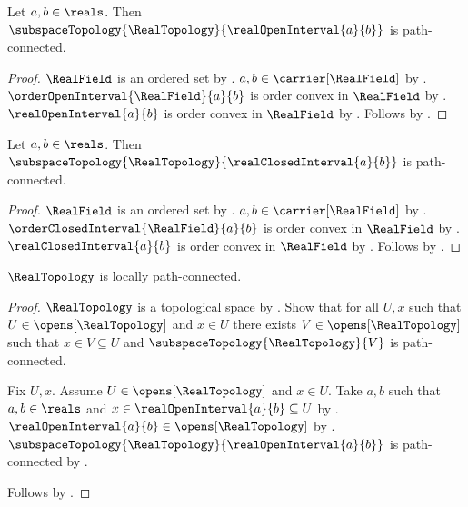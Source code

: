 \begin{theorem}\label{real_open_interval_is_path_connected}
    Let $a,b\in\reals$.
    Then $\subspaceTopology{\RealTopology}{\realOpenInterval{a}{b}}$ is path-connected.
\end{theorem}
\begin{proof}
    $\RealField$ is an ordered set by
        .
    $a,b\in\carrier[\RealField]$ by .
    $\orderOpenInterval{\RealField}{a}{b}$ is order convex in $\RealField$ by
        .
    $\realOpenInterval{a}{b}$ is order convex in $\RealField$ by
        .
    Follows by .
\end{proof}

\begin{theorem}\label{real_closed_interval_is_path_connected}
    Let $a,b\in\reals$.
    Then $\subspaceTopology{\RealTopology}{\realClosedInterval{a}{b}}$ is path-connected.
\end{theorem}
\begin{proof}
    $\RealField$ is an ordered set by
        .
    $a,b\in\carrier[\RealField]$ by .
    $\orderClosedInterval{\RealField}{a}{b}$ is order convex in $\RealField$ by
        .
    $\realClosedInterval{a}{b}$ is order convex in $\RealField$ by
        .
    Follows by .
\end{proof}

\begin{theorem}\label{real_topology_is_locally_path_connected}
    $\RealTopology$ is locally path-connected.
\end{theorem}
\begin{proof}
    $\RealTopology$ is a topological space by .
    Show that for all $U,x$ such that $U\in\opens[\RealTopology]$ and $x\in U$ there exists
        $V\in\opens[\RealTopology]$ such that $x\in V\subseteq U$ and
        $\subspaceTopology{\RealTopology}{V}$ is path-connected.
    \begin{subproof}
        Fix $U,x$.
        Assume $U\in\opens[\RealTopology]$ and $x\in U$.
        Take $a,b$ such that $a,b\in\reals$ and $x\in\realOpenInterval{a}{b}\subseteq U$ by
            .
        $\realOpenInterval{a}{b}\in\opens[\RealTopology]$ by .
        $\subspaceTopology{\RealTopology}{\realOpenInterval{a}{b}}$ is path-connected by
            .
    \end{subproof}
    Follows by .
\end{proof}
